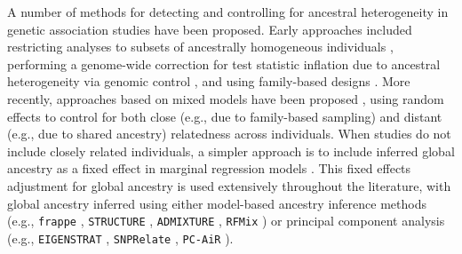 \documentclass[12pt]{article}
\begin{document}
A number of methods for detecting and controlling for ancestral heterogeneity in genetic association studies have been proposed. 
Early approaches included restricting analyses to subsets of ancestrally homogeneous individuals \citep{lander1994}, performing a genome-wide correction for test statistic inflation due to ancestral heterogeneity via genomic control \citep{GenomicControl}, and using family-based designs \citep{tdt}. 
More recently, approaches based on mixed models have been proposed \citep{yu2006, kang2010, yang2014}, using random effects to control for both close (e.g., due to family-based sampling) and distant (e.g., due to shared ancestry) relatedness across individuals.
When studies do not include closely related individuals, a simpler approach is to include inferred global ancestry as a fixed effect in marginal regression models \citep{eigenstrat, pritchard2000}. 
This fixed effects adjustment for global ancestry is used extensively throughout the literature, with global ancestry inferred using either model-based ancestry inference methods (e.g., \texttt{frappe} \citep{tang2005}, \texttt{STRUCTURE} \cite{structure}, \texttt{ADMIXTURE} \citep{admixture}, \texttt{RFMix} \citep{rfmix}) or principal component analysis (e.g., \texttt{EIGENSTRAT} \citep{eigenstrat}, \texttt{SNPRelate} \citep{snprelate}, \texttt{PC-AiR} \citep{conomos2015}).

\end{document}
